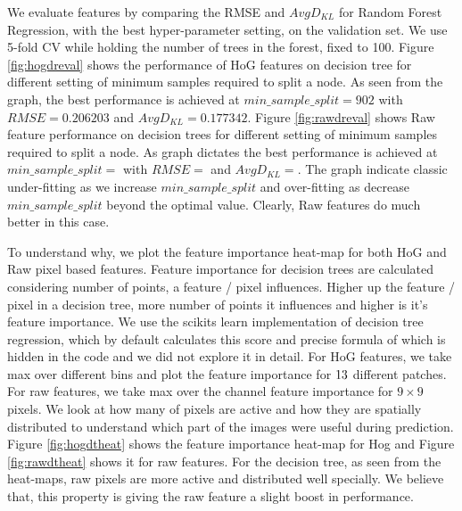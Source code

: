 \documentclass[10pt]{article}
\begin{document}
We evaluate features by comparing the RMSE and $ Avg D_{KL} $ for Random Forest Regression, with the best hyper-parameter setting, on the validation set. We use 5-fold CV while holding the number of trees in the forest, fixed to 100. Figure \ref{fig:hogdreval} shows the performance of HoG features on decision tree for different setting of minimum samples required to split a node. As seen from the graph, the best performance is achieved at  $ min\_sample\_split = 902$ with $RMSE=0.206203$ and $ Avg D_{KL} = 0.177342 $. Figure \ref{fig:rawdreval} shows Raw feature performance on decision trees for different setting of minimum samples required to split a node. As graph dictates the best performance is achieved at $ min\_sample\_split = $ with $RMSE= $ and $ Avg D_{KL} =  $. The graph indicate classic under-fitting as we increase $ min\_sample\_split $ and over-fitting as decrease $ min\_sample\_split $ beyond the optimal value. Clearly, Raw features do much better in this case. 

To understand why, we plot the feature importance heat-map for both HoG and Raw pixel based features. Feature importance for decision trees are calculated considering number of points, a feature / pixel influences. Higher up the feature / pixel in a decision tree, more number of points it influences and higher is it's feature importance. We use the scikits learn implementation of decision tree regression, which by default calculates this score and precise formula of which is hidden in the code and we did not explore it in detail. For HoG features, we take max over different bins and plot the feature importance for $13 \time 13$ different patches. For raw features, we take max over the channel feature importance for $9 \times 9$ pixels. We look at how many of pixels are active and how they are spatially distributed to understand which part of the images were useful during prediction. Figure \ref{fig:hogdtheat} shows the feature importance heat-map for Hog and Figure \ref{fig:rawdtheat} shows it for raw features. For the decision tree, as seen from the heat-maps, raw pixels are more active and distributed well specially. We believe that, this property is giving the raw feature a slight boost in performance.
\end{document}
